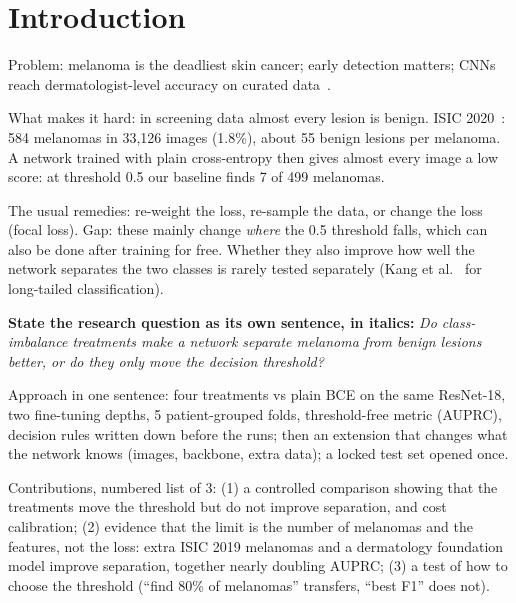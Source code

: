 
\section{Introduction}
\label{sec:intro}
\begin{notes}
  \item Problem: melanoma is the deadliest skin cancer; early detection matters; CNNs reach dermatologist-level accuracy on curated data~\cite{esteva2017dermatologist}.
  \item What makes it hard: in screening data almost every lesion is benign. ISIC 2020~\cite{rotemberg2021patient}: 584 melanomas in 33,126 images (1.8\%), about 55 benign lesions per melanoma. A network trained with plain cross-entropy then gives almost every image a low score: at threshold 0.5 our baseline finds 7 of 499 melanomas.
  \item The usual remedies: re-weight the loss, re-sample the data, or change the loss (focal loss). Gap: these mainly change \emph{where} the 0.5 threshold falls, which can also be done after training for free. Whether they also improve how well the network separates the two classes is rarely tested separately (Kang et al.~\cite{kang2020decoupling} for long-tailed classification).
  \item \textbf{State the research question as its own sentence, in italics:} \emph{Do class-imbalance treatments make a network separate melanoma from benign lesions better, or do they only move the decision threshold?}
  \item Approach in one sentence: four treatments vs plain BCE on the same ResNet-18, two fine-tuning depths, 5 patient-grouped folds, threshold-free metric (AUPRC), decision rules written down before the runs; then an extension that changes what the network knows (images, backbone, extra data); a locked test set opened once.
  \item Contributions, numbered list of 3: (1) a controlled comparison showing that the treatments move the threshold but do not improve separation, and cost calibration; (2) evidence that the limit is the number of melanomas and the features, not the loss: extra ISIC 2019 melanomas and a dermatology foundation model improve separation, together nearly doubling AUPRC; (3) a test of how to choose the threshold (``find 80\% of melanomas'' transfers, ``best F1'' does not).
\end{notes}

